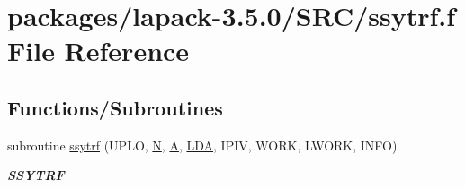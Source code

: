 \hypertarget{ssytrf_8f}{}\section{packages/lapack-\/3.5.0/\+S\+R\+C/ssytrf.f File Reference}
\label{ssytrf_8f}
\subsection*{Functions/\+Subroutines}
\begin{DoxyCompactItemize}
\item 
subroutine \hyperlink{group__realSYcomputational_ga12d2e56511cf7df066712c61d9acec45}{ssytrf} (U\+P\+L\+O, \hyperlink{polmisc_8c_a0240ac851181b84ac374872dc5434ee4}{N}, \hyperlink{classA}{A}, \hyperlink{example__user_8c_ae946da542ce0db94dced19b2ecefd1aa}{L\+D\+A}, I\+P\+I\+V, W\+O\+R\+K, L\+W\+O\+R\+K, I\+N\+F\+O)
\begin{DoxyCompactList}\small\item\em {\bfseries S\+S\+Y\+T\+R\+F} \end{DoxyCompactList}\end{DoxyCompactItemize}
